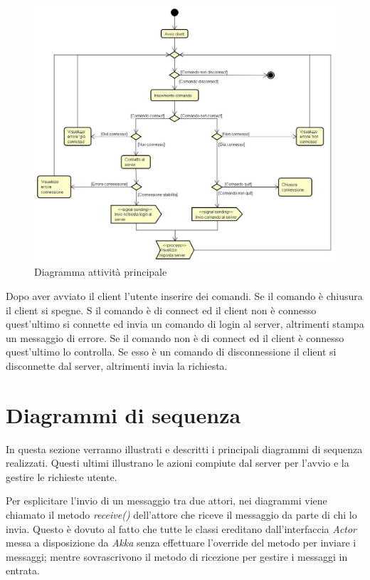 \documentclass[a4paper]{article}
\begin{document}
		\begin{figure} [H]
			\centering
			\includegraphics[width=\textwidth]{ST/Attivita/attivitaPrincipale.jpg}
			\caption{Diagramma attività principale}
		\end{figure}
		Dopo aver avviato il client l'utente inserire dei comandi. Se il comando è chiusura il client si spegne. S il comando è di connect ed il client non è connesso quest'ultimo si connette ed invia un comando di login al server, altrimenti stampa un messaggio di errore. Se il comando non è di connect ed il client è connesso quest'ultimo lo controlla. Se esso è un comando di disconnessione il client si disconnette dal server, altrimenti invia la richiesta.
		
	\newpage 
	\section{Diagrammi di sequenza}
        In questa sezione verranno illustrati e descritti i principali diagrammi di sequenza realizzati. Questi ultimi illustrano le azioni compiute dal server per l'avvio e la gestire le richieste utente.
        
        Per esplicitare l'invio di un messaggio tra due attori, nei diagrammi viene chiamato il metodo \textit{receive()} dell'attore che riceve il messaggio 
        da parte di chi lo invia.
        Questo è dovuto al fatto che tutte le classi ereditano dall'interfaccia \textit{Actor} messa a disposizione da \textit{Akka} senza effettuare 
        l'override del metodo per inviare i messaggi; mentre sovrascrivono il metodo di ricezione per gestire i messaggi in entrata.
        
\end{document}
